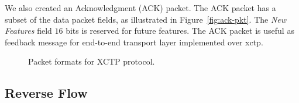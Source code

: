 We also created an Acknowledgment (ACK) packet. The ACK packet has a subset of the data packet fields, as illustrated in Figure~\ref{fig:ack-pkt}. The \textit{New Features} field $16$ bits is reserved for future features. The ACK packet is useful as feedback message for end-to-end transport layer implemented over \ac{xctp}.

\begin{figure}[!ht]
\center
 \caption{Packet formats for XCTP protocol.} \label{fig:pacotes}
\end{figure}

\subsection{Reverse Flow}
\label{sec:reverse-flow}

